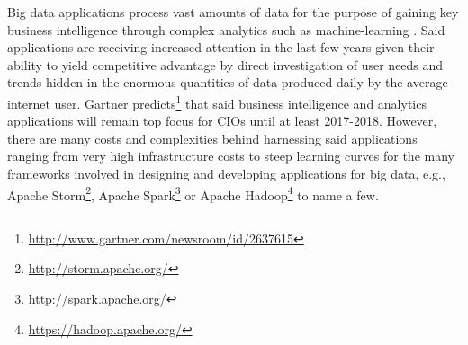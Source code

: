 
Big data applications process vast amounts of data \cite{bdsurvey} for the purpose of gaining key business intelligence through complex analytics such as machine-learning \cite{ml4bd}. Said applications are receiving increased attention in the last few years given their ability to yield competitive advantage by direct investigation of user needs and trends hidden in the enormous quantities of data produced daily by the average internet user. Gartner predicts\footnote{\url{http://www.gartner.com/newsroom/id/2637615}} that said business intelligence and analytics applications will remain top focus for CIOs until at least 2017-2018. 
However, there are many costs and complexities behind harnessing said applications ranging from very high infrastructure costs to steep learning curves for the many frameworks involved in designing and developing applications for big data, e.g., Apache Storm\footnote{\url{http://storm.apache.org/}}, Apache Spark\footnote{\url{http://spark.apache.org/}} or Apache Hadoop\footnote{\url{https://hadoop.apache.org/}} to name a few.

